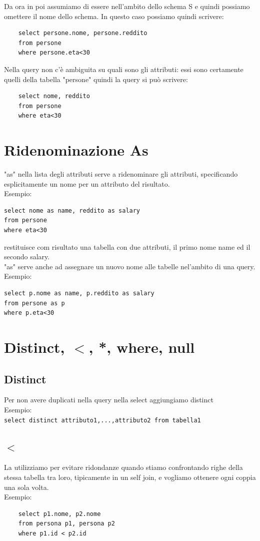 \noindent Da ora in poi assumiamo di essere nell'ambito dello schema S e quindi possiamo omettere il nome dello schema. In questo caso possiamo quindi scrivere:
\begin{verbatim}
    select persone.nome, persone.reddito
    from persone
    where persone.eta<30
\end{verbatim}
\noindent Nella query non c'è ambiguita su quali sono gli attributi: essi sono certamente quelli della tabella "persone" quindi la query si può scrivere:
\begin{verbatim}
    select nome, reddito
    from persone
    where eta<30
\end{verbatim}

\section{Ridenominazione As}
"as" nella lista degli attributi serve a ridenominare gli attributi, specificando esplicitamente un nome per un attributo del risultato.\\
\textcolor{verdeEsempio}{Esempio:}
\begin{verbatim}
select nome as name, reddito as salary
from persone
where eta<30
\end{verbatim}
\noindent restituisce com risultato una tabella con due attributi, il primo nome name ed il secondo salary.\\
"as" serve anche ad assegnare un nuovo nome alle tabelle nel'ambito di una query.\\
\textcolor{verdeEsempio}{Esempio:}
\begin{verbatim}
select p.nome as name, p.reddito as salary
from persone as p
where p.eta<30
\end{verbatim}
\section{Distinct, $<$, *, where, null}
\subsection{Distinct}
Per non avere duplicati nella query nella select aggiungiamo distinct\\
\textcolor{verdeEsempio}{Esempio:}\\
\texttt{select distinct attributo1,...,attributo2 from tabella1}
\subsection{$<$}
La utilizziamo per evitare ridondanze quando stiamo confrontando righe della stessa tabella tra loro, tipicamente in un self join, e vogliamo ottenere ogni coppia una sola volta.\\
\textcolor{verdeEsempio}{Esempio:}
\begin{verbatim}
    select p1.nome, p2.nome
    from persona p1, persona p2
    where p1.id < p2.id
\end{verbatim}
